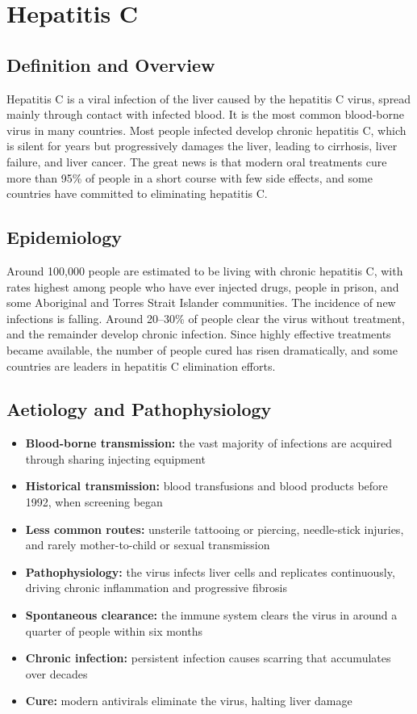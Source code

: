 \chapter{Hepatitis C}

\section*{Definition and Overview}
Hepatitis C is a viral infection of the liver caused by the hepatitis C virus, spread mainly through contact with infected blood. It is the most common blood-borne virus in many countries. Most people infected develop chronic hepatitis C, which is silent for years but progressively damages the liver, leading to cirrhosis, liver failure, and liver cancer. The great news is that modern oral treatments cure more than 95\% of people in a short course with few side effects, and some countries have committed to eliminating hepatitis C.

\section*{Epidemiology}
Around 100,000 people are estimated to be living with chronic hepatitis C, with rates highest among people who have ever injected drugs, people in prison, and some Aboriginal and Torres Strait Islander communities. The incidence of new infections is falling. Around 20--30\% of people clear the virus without treatment, and the remainder develop chronic infection. Since highly effective treatments became available, the number of people cured has risen dramatically, and some countries are leaders in hepatitis C elimination efforts.

\section*{Aetiology and Pathophysiology}
\begin{itemize}
    \item \textbf{Blood-borne transmission:} the vast majority of infections are acquired through sharing injecting equipment
    \item \textbf{Historical transmission:} blood transfusions and blood products before 1992, when screening began
    \item \textbf{Less common routes:} unsterile tattooing or piercing, needle-stick injuries, and rarely mother-to-child or sexual transmission
    \item \textbf{Pathophysiology:} the virus infects liver cells and replicates continuously, driving chronic inflammation and progressive fibrosis
    \item \textbf{Spontaneous clearance:} the immune system clears the virus in around a quarter of people within six months
    \item \textbf{Chronic infection:} persistent infection causes scarring that accumulates over decades
    \item \textbf{Cure:} modern antivirals eliminate the virus, halting liver damage
\end{itemize}

